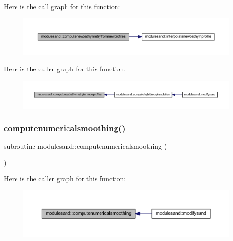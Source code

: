 Here is the call graph for this function\+:\nopagebreak
\begin{figure}[H]
\begin{center}
\leavevmode
\includegraphics[width=350pt]{namespacemodulesand_a27c9023e77c121f3086720bf6e9e8842_cgraph}
\end{center}
\end{figure}
Here is the caller graph for this function\+:\nopagebreak
\begin{figure}[H]
\begin{center}
\leavevmode
\includegraphics[width=350pt]{namespacemodulesand_a27c9023e77c121f3086720bf6e9e8842_icgraph}
\end{center}
\end{figure}
\mbox{\label{namespacemodulesand_aa8ec28ffb1310d31679a5053863f3452}} 
\subsubsection{\texorpdfstring{computenumericalsmoothing()}{computenumericalsmoothing()}}
{\footnotesize\ttfamily subroutine modulesand\+::computenumericalsmoothing (\begin{DoxyParamCaption}{ }\end{DoxyParamCaption})\hspace{0.3cm}{\ttfamily [private]}}

Here is the caller graph for this function\+:\nopagebreak
\begin{figure}[H]
\begin{center}
\leavevmode
\includegraphics[width=350pt]{namespacemodulesand_aa8ec28ffb1310d31679a5053863f3452_icgraph}
\end{center}
\end{figure}
\mbox{\label{namespacemodulesand_abe98db28fdf5e787bd658f6e3b181923}} 
